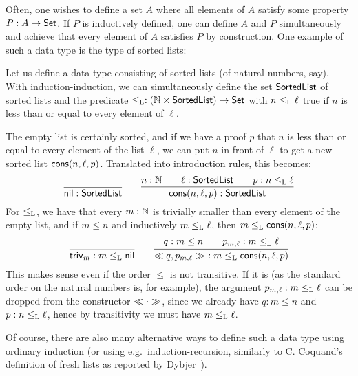 \documentclass{schwicht}
\begin{document}
Often, one wishes to define a set $A$ where all elements of $A$
satisfy some property $P : A \to \mathsf{Set}$. If $P$ is inductively defined,
one can define $A$ and $P$ simultaneously and achieve that every
element of $A$ satisfies $P$ by construction. One example of such a
data type is the type of sorted lists:

\begin{example}
\label{ex:sorted-list}

Let us define a data type consisting of sorted lists (of natural
numbers, say). With induction-induction, we can simultaneously define
the set $\mathsf{SortedList}$ of sorted lists and the predicate $\leq_{\text{L}} :
(\mathbb{N} \times \mathsf{SortedList}) \to \mathsf{Set}$ with $n \leq_{\text{L}} \ell$ true if
$n$ is less than or equal to every element of $\ell$.

The empty list is certainly sorted, and if we have a proof $p$ that
$n$ is less than or equal to every element of the list $\ell$, we can
put $n$ in front of $\ell$ to get a new sorted list
$\mathsf{cons}(n, \ell, p)$. Translated into introduction rules, this becomes:
\[
\infer{\nilList : \SortedList}{} \qquad
\infer{\consList{n}{\ell}{p} : \SortedList}{n : \Nat \quad & \ell : \SortedList \quad & p : n \lessList \ell}
\]
For $\leq_{\text{L}}$, we have that every $m : \mathbb{N}$ is trivially smaller
than every element of the empty list, and if $m \leq n$ and
inductively $m \leq_{\text{L}} \ell$, then $m \leq_{\text{L}} \mathsf{cons}(n, \ell, p)$:
\[
\infer{\nilLess{m} : m \lessList \nilList}
{} \qquad
\infer{\consLess{n}{\ell}{p}{m}{q}{p_{m, \ell}}\ : m \lessList \consList{n}{\ell}{p}}
       {q : m \leq n \quad & p_{m, \ell} : m \lessList \ell}
\]
This makes sense even if the order $\leq$ is not transitive. If it is
(as the standard order on the natural numbers is, for example), the
argument $p_{m, \ell} : m \leq_{\text{L}} \ell$ can be dropped from the
constructor $\ll \cdot \gg$, since we already have $q : m \leq n$ and
$p : n \leq_{\text{L}} \ell$, hence by transitivity we must have $m
\leq_{\text{L}} \ell$.

Of course, there are also many alternative ways to define such a data
type using ordinary induction (or using e.g.\ induction-recursion,
similarly to C. Coquand's definition of fresh lists as reported by
Dybjer~\cite{dybjer2000IR}).
\blackqed
\end{example}
\end{document}
